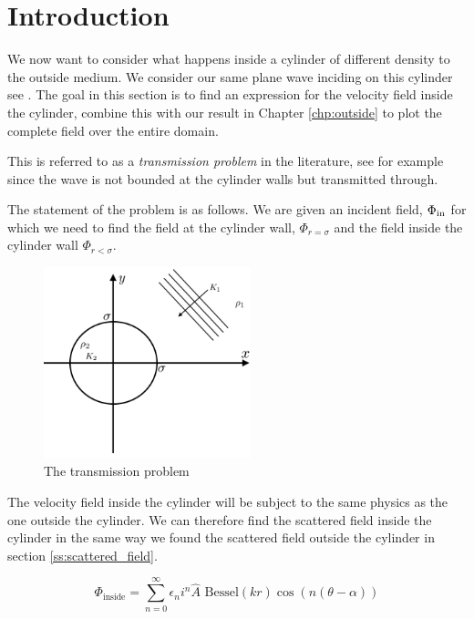 %
\section{Introduction}
We now want to consider what happens inside a cylinder of different density to the outside medium. We consider our same plane wave inciding on this cylinder see . The goal in this section is to find an expression for the velocity field inside the cylinder, combine this with our result in Chapter \ref{chp:outside} to plot the complete field over the entire domain. \par
%
This is referred to as a \emph{transmission problem} in the literature, see for example \cite[$\S$1.3.3]{martin06scattering} since the wave is not bounded at the cylinder walls but transmitted through. \par
%
The statement of the problem is as follows. We are given an incident field, $\Phi_{\text{in}}$ for which we need to find the field at the cylinder wall, $\Phi_{r=\sigma}$ and the field inside the cylinder wall $\Phi_{r<\sigma}$.
%
  \begin{figure} \centering
    \includegraphics[width=6cm]{../figures/prob2_sketch.png}
    \caption{The transmission problem}\label{fig:problem_2}
  \end{figure}
%
The velocity field inside the cylinder will be subject to the same physics as the one outside the cylinder. We can therefore find the scattered field inside the cylinder in the same way we found the scattered field outside the cylinder in section \ref{ss:scattered_field}. \par
%
  \begin{equation}
    \Phi_{\text{inside}} = \sum^\infty_{n=0} \epsilon_n i^n \hat{A} \text{ Bessel}(kr) \cos(n(\theta-\alpha))
  \end{equation}
